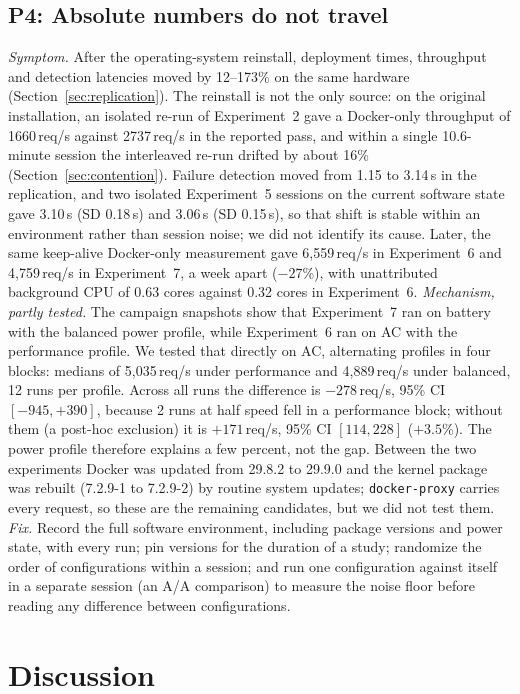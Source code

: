 \documentclass[conference]{IEEEtran}
\begin{document}
\subsection{P4: Absolute numbers do not travel}
\label{sec:p4}
\emph{Symptom.} After the operating-system reinstall, deployment times, throughput and
detection latencies moved by 12--173\% on the same hardware (Section~\ref{sec:replication}).
The reinstall is not the only source: on the original installation, an isolated re-run
of Experiment~2 gave a Docker-only throughput of 1660\,req/s against 2737\,req/s in the
reported pass, and within a single 10.6-minute session the interleaved re-run drifted
by about 16\% (Section~\ref{sec:contention}). Failure detection moved from 1.15 to 3.14\,s
in the replication, and two isolated Experiment~5 sessions on the current software state
gave 3.10\,s (SD 0.18\,s) and 3.06\,s (SD 0.15\,s), so that shift is stable within an
environment rather than session noise; we did not identify its cause.
Later, the same keep-alive Docker-only measurement gave 6{,}559\,req/s in Experiment~6 and
4{,}759\,req/s in Experiment~7, a week apart ($-27$\%), with unattributed background CPU
of 0.63 cores against 0.32 cores in Experiment~6. \emph{Mechanism, partly tested.} The
campaign snapshots show that Experiment~7 ran on battery with the balanced power profile,
while Experiment~6 ran on AC with the performance profile. We tested that directly on AC,
alternating profiles in four blocks: medians of 5{,}035\,req/s under performance and
4{,}889\,req/s under balanced, 12 runs per profile. Across all runs the difference is
$-278$\,req/s, 95\% CI $[-945, +390]$, because 2 runs at half speed fell in a performance
block; without them (a post-hoc exclusion) it is $+171$\,req/s, 95\% CI $[114, 228]$
($+3.5$\%). The power profile therefore explains a few percent, not the gap. Between the two
experiments Docker was updated from 29.8.2 to 29.9.0 and the kernel package was rebuilt
(7.2.9-1 to 7.2.9-2) by routine system updates; \texttt{docker-proxy} carries every request,
so these are the remaining candidates, but we did not test them. \emph{Fix.} Record the full
software environment, including package versions and power state, with every run; pin
versions for the duration of a study; randomize the order of configurations within a
session; and run one configuration against itself in a separate session (an A/A
comparison) to measure the noise floor before reading any difference between
configurations.

\section{Discussion}
\end{document}
